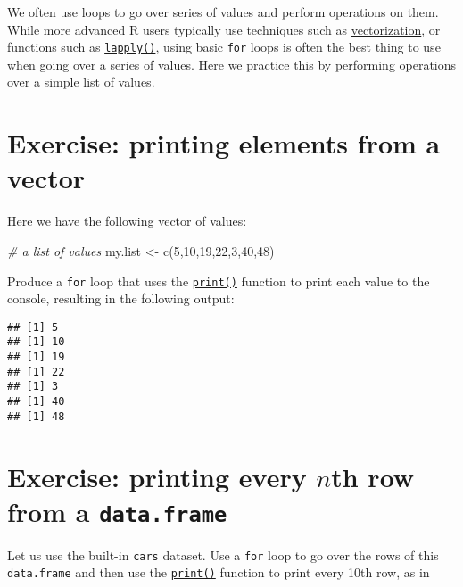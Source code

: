 \documentclass[
]{book}
\newenvironment{Shaded}{\begin{snugshade}}{\end{snugshade}}
\newcommand{\CommentTok}[1]{\textcolor[rgb]{0.56,0.35,0.01}{\textit{#1}}}
\newcommand{\DecValTok}[1]{\textcolor[rgb]{0.00,0.00,0.81}{#1}}
\newcommand{\FunctionTok}[1]{\textcolor[rgb]{0.00,0.00,0.00}{#1}}
\newcommand{\NormalTok}[1]{#1}
\newcommand{\OtherTok}[1]{\textcolor[rgb]{0.56,0.35,0.01}{#1}}
\begin{document}
We often use loops to go over series of values and perform operations on them. While more advanced R users typically use techniques such as \href{https://csgillespie.github.io/efficientR/programming.html\#vectorised-code}{vectorization}, or functions such as \href{https://rdrr.io/r/base/lapply.html}{\texttt{lapply()}}, using basic \texttt{for} loops is often the best thing to use when going over a series of values. Here we practice this by performing operations over a simple list of values.

\hypertarget{printEx}{%
\section{Exercise: printing elements from a vector}\label{printEx}}

Here we have the following vector of values:

\begin{Shaded}
\begin{Highlighting}[]
\CommentTok{\# a list of values}
\NormalTok{my.list }\OtherTok{\textless{}{-}} \FunctionTok{c}\NormalTok{(}\DecValTok{5}\NormalTok{,}\DecValTok{10}\NormalTok{,}\DecValTok{19}\NormalTok{,}\DecValTok{22}\NormalTok{,}\DecValTok{3}\NormalTok{,}\DecValTok{40}\NormalTok{,}\DecValTok{48}\NormalTok{)}
\end{Highlighting}
\end{Shaded}

Produce a \texttt{for} loop that uses the \href{https://stat.ethz.ch/R-manual/R-devel/library/base/html/print.html}{\texttt{print()}} function to print each value to the console, resulting in
the following output:

\begin{verbatim}
## [1] 5
## [1] 10
## [1] 19
## [1] 22
## [1] 3
## [1] 40
## [1] 48
\end{verbatim}

\hypertarget{exercise-printing-every-nth-row-from-a-data.frame}{%
\section{\texorpdfstring{Exercise: printing every \(n\)th row from a \texttt{data.frame}}{Exercise: printing every nth row from a data.frame}}\label{exercise-printing-every-nth-row-from-a-data.frame}}

Let us use the built-in \texttt{cars} dataset. Use a \texttt{for} loop to go over the rows of this \texttt{data.frame} and then use the \href{https://stat.ethz.ch/R-manual/R-devel/library/base/html/print.html}{\texttt{print()}} function to print every 10th row, as in
\end{document}
